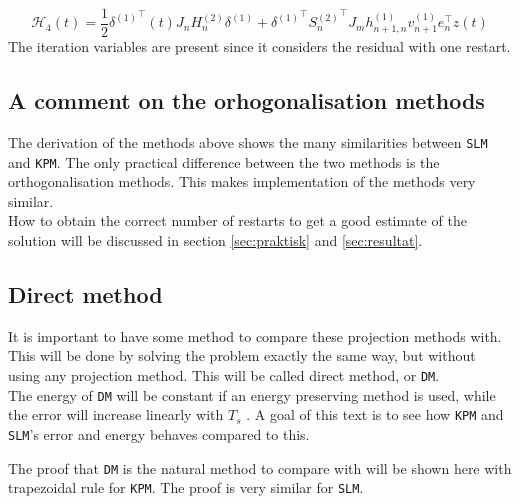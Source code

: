 \begin{equation}
\mathcal{H}_4 (t) = \frac{1}{2} {\delta^{(1)}}^\top (t) J_n H_n^{(2)} \delta^{(1)} + {\delta^{(1)}}^\top {S_n^{(2)}}^\top  J_m h_{n+1,n}^{(1)} v_{n+1}^{(1)} e_n^\top z(t)
\label{eqn:energy4}
\end{equation}
The iteration variables are present since it considers the residual with one restart.

\subsection{A comment on the orhogonalisation methods} %
The  derivation of the methods above shows the many similarities between \texttt{SLM} and \texttt{KPM}. The only practical difference between the two methods is the orthogonalisation methods. This makes implementation of the methods very similar.  \\

\noindent How to obtain the correct number of restarts to get a good estimate of the solution will be discussed in section \ref{sec:praktisk} and \ref{sec:resultat}.

\subsection{Direct method} \label{sec:DM}
It is important to have some method to compare these projection methods with. This will be done by solving the problem exactly the same way, but without using any projection method. This will be called direct method, or \texttt{DM}. \\

\noindent The energy of \texttt{DM} will be constant if an energy preserving method is used, while the error will increase linearly with $T_s$ \cite{linearerrorgrowth}. A goal of this text is to see how \texttt{KPM} and \texttt{SLM}'s error and energy behaves compared to this. 

\noindent The proof that \texttt{DM} is the natural method to compare with will be shown here with trapezoidal rule for \texttt{KPM}. The proof is very similar for \texttt{SLM}. \\


